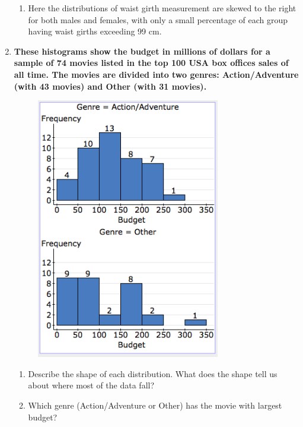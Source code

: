 \begin{enumerate}
\begin{enumerate}
\item Here the distributions of waist girth measurement are skewed to the
right for both males and females, with only a small percentage of
each group having waist girths exceeding 99 cm.\newpage{}
\end{enumerate}
\item \textbf{These histograms show the budget in millions of dollars for
a sample of 74 movies listed in the top 100 USA box offices sales
of all time. The movies are divided into two genres: Action/Adventure
(with 43 movies) and Other (with 31 movies).}\\
\begin{figure}[H]
\noindent \begin{centering}
\includegraphics[clip,height=4.5in]{./img/image2}
\par\end{centering}

\end{figure}


\begin{enumerate}
\item Describe the shape of each distribution. What does the shape tell
us about where most of the data fall?\vspace{0.5in}

\item Which genre (Action/Adventure or Other) has the movie with largest
budget?\vspace{0.5in}


\end{enumerate}
\end{enumerate}
